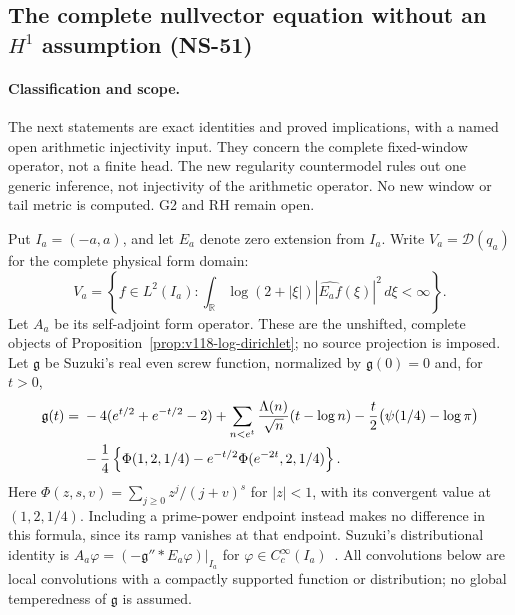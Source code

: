 \subsection*{The complete nullvector equation without an $H^1$ assumption (NS-51)}

\paragraph{Classification and scope.}
The next statements are exact identities and proved implications, with a
named open arithmetic injectivity input. They concern the complete
fixed-window operator, not a finite head. The new regularity countermodel
rules out one generic inference, not injectivity of the arithmetic
operator. No new window or tail metric is computed. G2 and RH remain open.

Put $I_a=(-a,a)$, and let $E_a$ denote zero extension from $I_a$.
Write $V_a=\mathcal D(q_a)$ for the complete physical form domain:
\[
 V_a=\left\{f\in L^2(I_a):
  \int_{\mathbb R}\log(2+|\xi|)|\widehat{E_af}(\xi)|^2\,d\xi<\infty\right\}.
\]
Let $A_a$ be its self-adjoint form operator. These are the unshifted,
complete objects of Proposition~\ref{prop:v118-log-dirichlet}; no source
projection is imposed. Let $\mathfrak g$ be Suzuki's real even screw
function, normalized by $\mathfrak g(0)=0$ and, for $t>0$,
\begin{align}
 \mathfrak g(t)={}&-4(e^{t/2}+e^{-t/2}-2)
  +\sum_{n<e^t}\frac{\Lambda(n)}{\sqrt n}(t-\log n)
  -\frac t2\bigl(\psi(1/4)-\log\pi\bigr)\notag\\
 &-\frac14\left\{\Phi(1,2,1/4)
             -e^{-t/2}\Phi(e^{-2t},2,1/4)\right\}.
 \label{eq:ns51-screw}
\end{align}
Here $\Phi(z,s,v)=\sum_{j\ge0}z^j/(j+v)^s$ for $|z|<1$,
with its convergent value at $(1,2,1/4)$. Including a prime-power
endpoint instead makes no difference in this formula, since its ramp
vanishes at that endpoint. Suzuki's distributional identity is
$A_a\varphi=(-\mathfrak g''*E_a\varphi)|_{I_a}$ for
$\varphi\in C_c^\infty(I_a)$~\cite[Sections 2.5 and 3]{Suzuki2026}.
All convolutions below are local convolutions with a compactly supported
function or distribution; no global temperedness of $\mathfrak g$ is
assumed.

